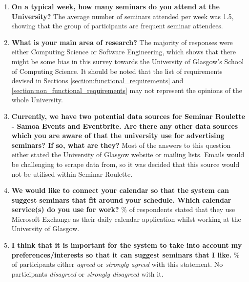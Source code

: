 \documentclass{l4proj}
\begin{document}
\begin{enumerate}
    \itemsep1em 

    \item \textbf{On a typical week, how many seminars do you attend at the University?}
    \newline
    The average number of seminars attended per week was 1.5, showing that the group of participants are frequent seminar attendees.
    
    \item \textbf{What is your main area of research?}
    \newline
    The majority of responses were either Computing Science or Software Engineering, which shows that there might be some bias in this survey towards the University of Glasgow's School of Computing Science. It should be noted that the list of requirements devised in Sections \ref{section:functional_requirements} and \ref{section:non_functional_requirements} may not represent the opinions of the whole University.
    
    \item \textbf{Currently, we have two potential data sources for Seminar Roulette - Samoa Events and Eventbrite. Are there any other data sources which you are aware of that the university use for advertising seminars? If so, what are they?}
    \newline
    Most of the answers to this question either stated the University of Glasgow website or mailing lists. Emails would be challenging to scrape data from, so it was decided that this source would not be utilised within Seminar Roulette.
    
    \item \textbf{We would like to connect your calendar so that the system can suggest seminars that fit around your schedule. Which calendar service(s) do you use for work?}
    \% of respondents stated that they use Microsoft Exchange as their daily calendar application whilst working at the University of Glasgow.
    
    \item \textbf{I think that it is important for the system to take into account my preferences/interests so that it can suggest seminars that I like.}
    \% of participants either \emph{agreed} or \emph{strongly agreed} with this statement. No participants \emph{disagreed} or \emph{strongly disagreed} with it.
    

\end{enumerate}
\end{document}
